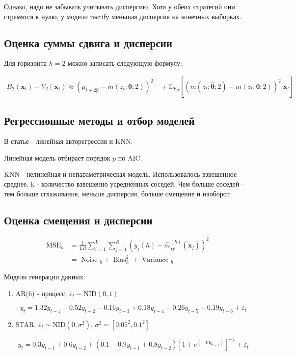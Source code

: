 \documentclass[a4paper,12pt]{article}
\begin{document}
Однако, надо не забывать учитывать дисперсию. Хотя у обеих стратегий они стремятся к нулю, у модели rectify меньшая дисперсия на конечных выборках.

\subsection{Оценка суммы сдвига и дисперсии}

Для горизонта $ h=2 $ можно записать следующую формулу:

\[
\begin{array}{l}{B_{2}\left(\boldsymbol{x}_{t}\right)+V_{2}\left(\boldsymbol{x}_{t}\right)}  {\approx\left(\mu_{t+2 | t}-m\left(z_{t} ; \boldsymbol{\theta} ; 2\right)\right)^{2}} {\quad + \mathbb{E}_{\boldsymbol{Y}_{T}}\left[\left(m\left(z_{t} ; \hat{\boldsymbol{\theta}} ; 2\right)-m\left(z_{t} ; \boldsymbol{\theta} ; 2\right)\right)^{2} | \boldsymbol{x}_{t}\right]}\end{array}
\]



\subsection{Регрессионные методы и отбор моделей}

В статье - линейная авторегрессия и KNN.

Линейная модель отбирает порядок $ p $ по AIC.

KNN - нелинейная и непараметрическая модель. Использовалось взвешенное среднее. k - количество взвешенно усреднённых соседей. Чем больше соседей - тем больше сглаживание, меньше дисперсия, больше смещение и наоборот

\subsection{Оценка смещения и дисперсии}

\[
\begin{aligned} \mathrm{MSE}_{h} &=\frac{1}{L R} \sum_{i=1}^{L} \sum_{j=1}^{R}\left(y_{j}(h)-\hat{m}_{D^{i}}^{(h)}\left(\boldsymbol{x}_{j}\right)\right)^{2} \\ &=\text { Noise }_{h}+\operatorname{Bias}_{h}^{2}+\text { Variance }_{h} \end{aligned}
\]

Модели генерации данных:

\begin{enumerate}[\Sun]
	\item AR(6) - процесс, 	$\varepsilon_{t} \sim \mathrm{NID}(0,1)$
	
	\[
	y_{t}=1.32 y_{t-1}-0.52 y_{t-2}-0.16 y_{t-3}+0.18 y_{t-4}-0.26 y_{t-5}+0.19 y_{t-6}+\varepsilon_{t}
	\]
	
	\item STAR, $\varepsilon_{t} \sim \mathrm{NID}\left(0, \sigma^{2}\right)$, $\sigma^{2}=\left[0.05^{2}, 0.1^{2}\right]$
	
	\[
	y_{t}=0.3 y_{t-1}+0.6 y_{t-2}+\left(0.1-0.9 y_{t-1}+0.8 y_{t-2}\right)\left[1+e^{\left(-10 y_{t-1}\right)}\right]^{-1}+\varepsilon_{t}
	\]

\end{enumerate}
\end{document}
